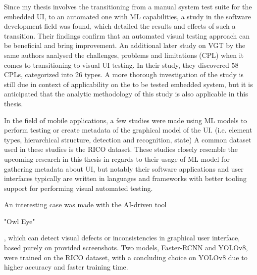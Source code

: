 \documentclass[Proposal,BIC,english,IEEE]{BASE/twbook} %
\begin{document}
Since my thesis involves the transitioning from a manual system test suite for the embedded UI, to an automated one with ML capabilities, a study in the software development field \autocite{alegrothTransitioningManualSystem2013} was found, which detailed the results and effects of such a transition. Their findings confirm that an automated visual testing approach can be beneficial and bring improvement.
An additional later study on VGT by the same authors \autocite{alegrothVisualGUITesting2015} analysed the challenges, problems and limitations (CPL) when it comes to transitioning to visual UI testing. In their study, they discovered 58 CPLs, categorized into 26 types. A more thorough investigation of the study is still due in context of applicability on the to be tested embedded system, but it is anticipated that the analytic methodology of this study is also applicable in this thesis.

In the field of mobile applications, a few studies were made using ML models to perform testing or create metadata of the graphical model of the UI. (i.e. element types, hierarchical structure, detection and recognition, state)
\autocite{altinbasGUIElementDetection2022,chengMobileApplicationGUI2021,liWidgetCaptioningGenerating2020,selcukComparisonYOLOv5YOLOv82023,zhangDeepLearningBasedMobile2020,zhangMachineVisionbasedTesting2022, cavsakGUIComponentDetection} A common dataset used in these studies is the RICO dataset. \autocite{dekaRicoMobileApp2017}
These studies closely resemble the upcoming research in this thesis in regards to their usage of ML model for gathering metadata about UI, but notably their software applications and user interfaces typically are written in languages and frameworks with better tooling support for performing visual automated testing.

An interesting case was made with the AI-driven tool \begin{em}"Owl Eye"\end{em} \autocite{gamalOwlEyeAIDriven2023}, which can detect visual defects or inconsistencies in graphical user interface, based purely on provided screenshots. Two models, Faster-RCNN and YOLOv8, were trained on the RICO dataset, with a concluding choice on YOLOv8 due to higher accuracy and faster training time.
\end{document}
